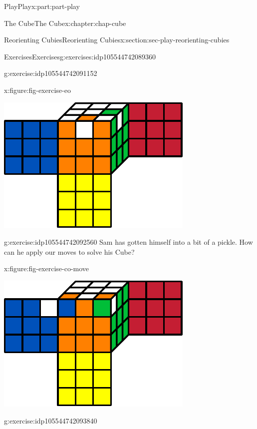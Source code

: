\documentclass[oneside,10pt,]{book}
\numberwithin{equation}{section}
\begin{document}
\begin{partptx}{Play}{}{Play}{}{}{x:part:part-play}
\begin{chapterptx}{The Cube}{}{The Cube}{}{}{x:chapter:chap-cube}
\begin{sectionptx}{Reorienting Cubies}{}{Reorienting Cubies}{}{}{x:section:sec-play-reorienting-cubies}
\begin{exercises-subsection-numberless}{Exercises}{}{Exercises}{}{}{g:exercises:idp105544742089360}
\begin{divisionexercise}{2}{}{}{g:exercise:idp105544742091152}
\begin{figureptx}{}{x:figure:fig-exercise-eo}{}
\begin{image}{0.25}{0.5}{0.25}
\includegraphics[width=\linewidth]{./images/eo-exer.pdf}
\end{image}%
\tcblower
\end{figureptx}%
\end{divisionexercise}%
\begin{divisionexercise}{3}{}{}{g:exercise:idp105544742092560}%
Sam has gotten himself into a bit of a pickle. How can he apply our moves to solve his Cube?%
\begin{figureptx}{}{x:figure:fig-exercise-co-move}{}%
\begin{image}{0.25}{0.5}{0.25}%
\includegraphics[width=\linewidth]{./images/co02.pdf}
\end{image}%
\tcblower
\end{figureptx}%
\end{divisionexercise}%
\begin{divisionexercise}{4}{}{}{g:exercise:idp105544742093840}%

\end{divisionexercise}
\end{exercises-subsection-numberless}
\end{sectionptx}
\end{chapterptx}
\end{partptx}
\end{document}

